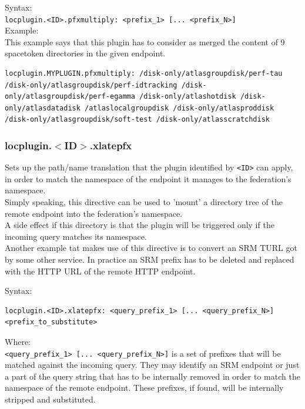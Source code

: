 \documentclass[12pt]{article} %
\begin{document}
Syntax:\\
\lstinline{locplugin.<ID>.pfxmultiply: <prefix_1> [... <prefix_N>]}\\

Example:\\
This example says that this plugin has to consider as merged the content of 9 spacetoken directories in the given endpoint.\\
\begin{lstlisting}
locplugin.MYPLUGIN.pfxmultiply: /disk-only/atlasgroupdisk/perf-tau /disk-only/atlasgroupdisk/perf-idtracking /disk-only/atlasgroupdisk/perf-egamma /disk-only/atlashotdisk /disk-only/atlasdatadisk /atlaslocalgroupdisk /disk-only/atlasproddisk /disk-only/atlasgroupdisk/soft-test /disk-only/atlasscratchdisk
\end{lstlisting}

\subsubsection{locplugin.$<$ID$>$.xlatepfx}
Sets up the path/name translation that the plugin identified by \lstinline"<ID>" can apply, in order to match the namespace of the endpoint it manages to the federation's namespace.\\
Simply speaking, this directive can be used to 'mount' a directory tree of the remote endpoint into the federation's namespace.\\

A side effect if this directory is that the plugin will be triggered only if the incoming query matches its namespace.\\

Another example tat makes use of this directive is to convert an SRM TURL got by some other service. In practice an SRM prefix has to be deleted and replaced with the HTTP URL of the remote HTTP endpoint.

Syntax:\\
\begin{lstlisting}
locplugin.<ID>.xlatepfx: <query_prefix_1> [... <query_prefix_N>] <prefix_to_substitute>
\end{lstlisting}
Where: \\

\lstinline"<query_prefix_1> [... <query_prefix_N>]" is a set of prefixes that will be matched against the incoming query. They may identify an SRM endpoint or just a part of the query string that has to be internally
removed in order to match the namespace of the remote endpoint. These prefixes, if found, will be internally stripped and substituted.\\
\end{document}

